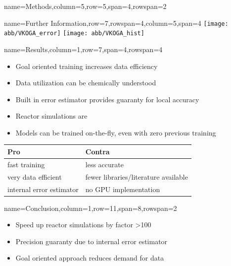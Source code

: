\documentclass[
	accentcolor=3c,
	boxstyle=colored, %
	colorback=false,
	title=small
	]{tudasciposter}
\begin{document}
\begin{tcbposter}[
	poster={
		columns=8,
		rows=12,
		spacing=1cm,
	},]
\begin{posterboxenv}[title=2. Methods]{name=Methods,column=5,row=5,span=4,rowspan=2}
\end{posterboxenv}

\begin{posterboxenv}{name=Further Information,row=7,rowspan=4,column=5,span=4}
	\texttt{[image: abb/VKOGA\_error]} %
	\texttt{[image: abb/VKOGA\_hist]}
\end{posterboxenv}

\begin{posterboxenv}[title=3. Results]{name=Results,column=1,row=7,span=4,rowspan=4}
	\begin{itemize}
		\item Goal oriented training increases data efficiency
		\item Data utilization can be chemically understood
		\item Built in error estimator provides guaranty for local accuracy
		\item Reactor simulations are 
		\item Models can be trained on-the-fly, even with zero previous training
	\end{itemize}
	\vspace{2cm}
	\begin{tabularx}{\textwidth}{XX}
		\toprule
		Pro & Contra \\ \midrule
		fast training & less accurate \\ 
		very data efficient & fewer libraries/literature available\\
		internal error estimator & no GPU implementation\\		
		\bottomrule
	\end{tabularx}%
	


\end{posterboxenv}

\begin{posterboxenv}[title=4. Conclusion]{name=Conclusion,column=1,row=11,span=8,rowspan=2}
\begin{multicols}{2}		
	\begin{itemize}
		\item Speed up reactor simulations by factor >100
		\item Precision guaranty due to internal error estimator
		\item Goal oriented approach reduces demand for data
	\end{itemize}
\end{multicols}

\end{posterboxenv}

\end{tcbposter}
\end{document}
